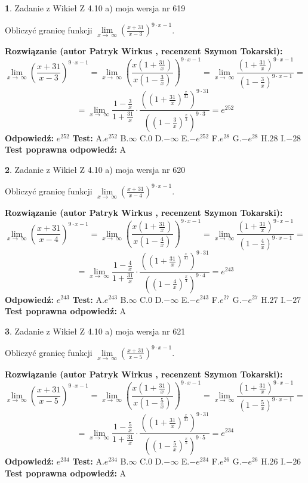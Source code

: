 \documentclass[12pt, a4paper]{article}
\theoremstyle{definition} %
\newtheorem{zad}{}
\newcommand{\zadStart}[1]{\begin{zad}#1\newline}
\newcommand{\zadStop}{\end{zad}}
\newcommand{\rozwStart}[2]{\noindent \textbf{Rozwiązanie (autor #1 , recenzent #2): }\newline}
\newcommand{\rozwStop}{\newline}
\newcommand{\odpStart}{\noindent \textbf{Odpowiedź:}\newline}
\newcommand{\odpStop}{\newline}
\newcommand{\testStart}{\noindent \textbf{Test:}\newline}
\newcommand{\testStop}{\newline}
\newcommand{\kluczStart}{\noindent \textbf{Test poprawna odpowiedź:}\newline}
\newcommand{\kluczStop}{\newline}
\begin{document}
\zadStart{Zadanie z Wikieł Z 4.10 a) moja wersja nr 619}

Obliczyć granicę funkcji  $\lim\limits_{x\to\ \infty}(\frac{x+31}{x-3})^{9\cdot x-1}$.
\zadStop
\rozwStart{Patryk Wirkus}{Szymon Tokarski}
$$\lim\limits_{x\to\ \infty}(\frac{x+31}{x-3})^{9\cdot x-1} = \lim\limits_{x\to\ \infty}(\frac{x(1+\frac{31}{x})}{x(1-\frac{3}{x})})^{9\cdot x-1}=\lim\limits_{x\to\ \infty}\frac{(1+\frac{31}{x})^{9\cdot x-1}}{(1-\frac{3}{x})^{9\cdot x-1}}=$$
$$=\lim\limits_{x\to\ \infty}\frac{1-\frac{3}{x}}{1+\frac{31}{x}}\cdot\frac{((1+\frac{31}{x})^{\frac{x}{31}})^{9\cdot31}}{((1-\frac{3}{x})^{\frac{x}{3}})^{9\cdot3}}=e^{252}$$
\rozwStop
\odpStart
$e^{252}$
\odpStop
\testStart
A.$e^{252}$ B.$\infty$ C.$0$ D.$-\infty$ E.$-e^{252}$
F.$e^{28}$ G.$-e^{28}$
H.$28$
I.$-28$
\testStop
\kluczStart
A
\kluczStop



\zadStart{Zadanie z Wikieł Z 4.10 a) moja wersja nr 620}

Obliczyć granicę funkcji  $\lim\limits_{x\to\ \infty}(\frac{x+31}{x-4})^{9\cdot x-1}$.
\zadStop
\rozwStart{Patryk Wirkus}{Szymon Tokarski}
$$\lim\limits_{x\to\ \infty}(\frac{x+31}{x-4})^{9\cdot x-1} = \lim\limits_{x\to\ \infty}(\frac{x(1+\frac{31}{x})}{x(1-\frac{4}{x})})^{9\cdot x-1}=\lim\limits_{x\to\ \infty}\frac{(1+\frac{31}{x})^{9\cdot x-1}}{(1-\frac{4}{x})^{9\cdot x-1}}=$$
$$=\lim\limits_{x\to\ \infty}\frac{1-\frac{4}{x}}{1+\frac{31}{x}}\cdot\frac{((1+\frac{31}{x})^{\frac{x}{31}})^{9\cdot31}}{((1-\frac{4}{x})^{\frac{x}{4}})^{9\cdot4}}=e^{243}$$
\rozwStop
\odpStart
$e^{243}$
\odpStop
\testStart
A.$e^{243}$ B.$\infty$ C.$0$ D.$-\infty$ E.$-e^{243}$
F.$e^{27}$ G.$-e^{27}$
H.$27$
I.$-27$
\testStop
\kluczStart
A
\kluczStop



\zadStart{Zadanie z Wikieł Z 4.10 a) moja wersja nr 621}

Obliczyć granicę funkcji  $\lim\limits_{x\to\ \infty}(\frac{x+31}{x-5})^{9\cdot x-1}$.
\zadStop
\rozwStart{Patryk Wirkus}{Szymon Tokarski}
$$\lim\limits_{x\to\ \infty}(\frac{x+31}{x-5})^{9\cdot x-1} = \lim\limits_{x\to\ \infty}(\frac{x(1+\frac{31}{x})}{x(1-\frac{5}{x})})^{9\cdot x-1}=\lim\limits_{x\to\ \infty}\frac{(1+\frac{31}{x})^{9\cdot x-1}}{(1-\frac{5}{x})^{9\cdot x-1}}=$$
$$=\lim\limits_{x\to\ \infty}\frac{1-\frac{5}{x}}{1+\frac{31}{x}}\cdot\frac{((1+\frac{31}{x})^{\frac{x}{31}})^{9\cdot31}}{((1-\frac{5}{x})^{\frac{x}{5}})^{9\cdot5}}=e^{234}$$
\rozwStop
\odpStart
$e^{234}$
\odpStop
\testStart
A.$e^{234}$ B.$\infty$ C.$0$ D.$-\infty$ E.$-e^{234}$
F.$e^{26}$ G.$-e^{26}$
H.$26$
I.$-26$
\testStop
\kluczStart
A
\kluczStop
\end{document}
